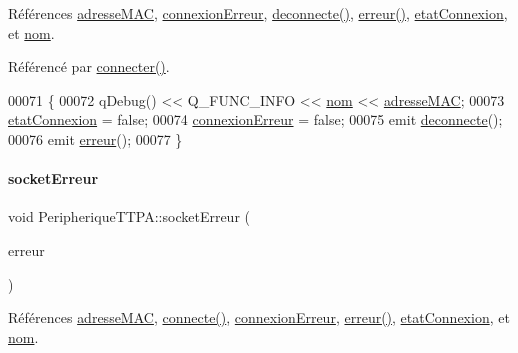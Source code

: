 Références \hyperlink{class_peripherique_t_t_p_a_a444063230c83cf81eff8a3a55736f2cf}{adresse\+M\+AC}, \hyperlink{class_peripherique_t_t_p_a_a9602c4662641984ea44bf6caaac6e94c}{connexion\+Erreur}, \hyperlink{class_peripherique_t_t_p_a_a8cb56776db43953cceb04e5f3ee4ca7b}{deconnecte()}, \hyperlink{class_peripherique_t_t_p_a_a7a31d9f923cc71a42d0dab80d9332eb6}{erreur()}, \hyperlink{class_peripherique_t_t_p_a_a3aaac9f045cc038777895afe18411e58}{etat\+Connexion}, et \hyperlink{class_peripherique_t_t_p_a_afafe3566b4b5357819811218b9a4244f}{nom}.



Référencé par \hyperlink{class_peripherique_t_t_p_a_a8afa92f7c3ae6e1edc30f5c8b386af81}{connecter()}.


\begin{DoxyCode}
00071 \{
00072     qDebug() << Q\_FUNC\_INFO << \hyperlink{class_peripherique_t_t_p_a_afafe3566b4b5357819811218b9a4244f}{nom} << \hyperlink{class_peripherique_t_t_p_a_a444063230c83cf81eff8a3a55736f2cf}{adresseMAC};
00073     \hyperlink{class_peripherique_t_t_p_a_a3aaac9f045cc038777895afe18411e58}{etatConnexion} = \textcolor{keyword}{false};
00074     \hyperlink{class_peripherique_t_t_p_a_a9602c4662641984ea44bf6caaac6e94c}{connexionErreur} = \textcolor{keyword}{false};
00075     emit \hyperlink{class_peripherique_t_t_p_a_a8cb56776db43953cceb04e5f3ee4ca7b}{deconnecte}();
00076     emit \hyperlink{class_peripherique_t_t_p_a_a7a31d9f923cc71a42d0dab80d9332eb6}{erreur}();
00077 \}
\end{DoxyCode}
\mbox{\label{class_peripherique_t_t_p_a_a85811ace874ff7cea3437146511f1b2c}} 
\paragraph{\texorpdfstring{socket\+Erreur}{socketErreur}}
{\footnotesize\ttfamily void Peripherique\+T\+T\+P\+A\+::socket\+Erreur (\begin{DoxyParamCaption}\item[{Q\+Bluetooth\+Socket\+::\+Socket\+Error}]{erreur }\end{DoxyParamCaption})\hspace{0.3cm}{\ttfamily [slot]}}



Références \hyperlink{class_peripherique_t_t_p_a_a444063230c83cf81eff8a3a55736f2cf}{adresse\+M\+AC}, \hyperlink{class_peripherique_t_t_p_a_ae95f1fe6bb1908b5eb2d34a469f7f873}{connecte()}, \hyperlink{class_peripherique_t_t_p_a_a9602c4662641984ea44bf6caaac6e94c}{connexion\+Erreur}, \hyperlink{class_peripherique_t_t_p_a_a7a31d9f923cc71a42d0dab80d9332eb6}{erreur()}, \hyperlink{class_peripherique_t_t_p_a_a3aaac9f045cc038777895afe18411e58}{etat\+Connexion}, et \hyperlink{class_peripherique_t_t_p_a_afafe3566b4b5357819811218b9a4244f}{nom}.



